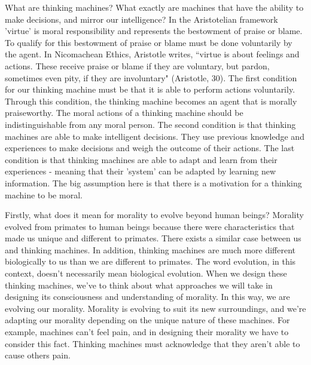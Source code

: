 \documentclass[11pt, oneside]{article}
\begin{document}
\par What are thinking machines? What exactly are machines that have the ability to make decisions, and mirror our intelligence? In the Aristotelian framework 'virtue' is moral responsibility and represents the bestowment of praise or blame. To qualify for this bestowment of praise or blame must be done voluntarily by the agent. In Nicomachean Ethics, Aristotle writes, ``virtue is about feelings and actions. These receive praise or blame if they are voluntary, but pardon, sometimes even pity, if they are involuntary" (Aristotle, 30). The first condition for our thinking machine must be that it is able to perform actions voluntarily. Through this condition, the thinking machine becomes an agent that is morally praiseworthy. The moral actions of a thinking machine should be indistinguishable from any moral person. The second condition is that thinking machines are able to make intelligent decisions. They use previous knowledge and experiences to make decisions and weigh the outcome of their actions. The last condition is that thinking machines are able to adapt and learn from their experiences - meaning that their 'system' can be adapted by learning new information. The big assumption here is that there is a motivation for a thinking machine to be moral.
 
\par Firstly, what does it mean for morality to evolve beyond human beings? Morality evolved from primates to human beings because there were characteristics that made us unique and different to primates. There exists a similar case between us and thinking machines. In addition, thinking machines are much more different biologically to us than we are different to primates. The word evolution, in this context, doesn't necessarily mean biological evolution. When we design these thinking machines, we've to think about what approaches we will take in designing its consciousness and understanding of morality. In this way, we are evolving our morality. Morality is evolving to suit its new surroundings, and we're adapting our morality depending on the unique nature of these machines. For example, machines can't feel pain, and in designing their morality we have to consider this fact. Thinking machines must acknowledge that they aren't able to cause others pain.
 
\end{document}
